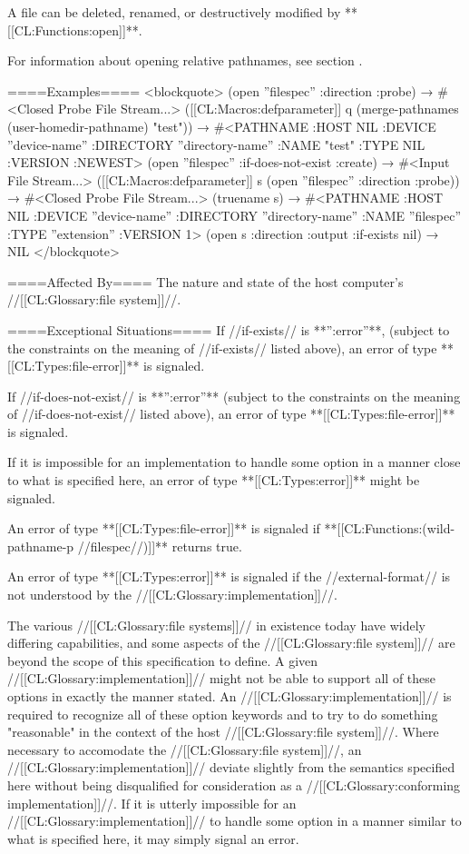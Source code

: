 A file can be deleted, renamed, or destructively modified by **[[CL:Functions:open]]**.

For information about opening relative pathnames, see section {\secref\MergingPathnames}.

====Examples====
<blockquote> (open ''filespec'' :direction :probe) → #<Closed Probe File Stream...> ([[CL:Macros:defparameter]] q (merge-pathnames (user-homedir-pathname) "test")) → #<PATHNAME :HOST NIL :DEVICE ''device-name'' :DIRECTORY ''directory-name'' :NAME "test" :TYPE NIL :VERSION :NEWEST> (open ''filespec'' :if-does-not-exist :create) → #<Input File Stream...> ([[CL:Macros:defparameter]] s (open ''filespec'' :direction :probe)) → #<Closed Probe File Stream...> (truename s) → #<PATHNAME :HOST NIL :DEVICE ''device-name'' :DIRECTORY ''directory-name'' :NAME ''filespec'' :TYPE ''extension'' :VERSION 1> (open s :direction :output :if-exists nil) → NIL </blockquote>

====Affected By====
The nature and state of the host computer's //[[CL:Glossary:file system]]//.

====Exceptional Situations====
If //if-exists// is **'':error''**, (subject to the constraints on the meaning of //if-exists// listed above), an error of type **[[CL:Types:file-error]]** is signaled.

If //if-does-not-exist// is **'':error''** (subject to the constraints on the meaning of //if-does-not-exist// listed above), an error of type **[[CL:Types:file-error]]** is signaled.

If it is impossible for an implementation to handle some option in a manner close to what is specified here, an error of type **[[CL:Types:error]]** might be signaled.

An error of type **[[CL:Types:file-error]]** is signaled if **[[CL:Functions:(wild-pathname-p //filespec//)]]** returns true.

An error of type **[[CL:Types:error]]** is signaled if the //external-format// is not understood by the //[[CL:Glossary:implementation]]//.

The various //[[CL:Glossary:file systems]]// in existence today have widely differing capabilities, and some aspects of the //[[CL:Glossary:file system]]// are beyond the scope of this specification to define. A given //[[CL:Glossary:implementation]]// might not be able to support all of these options in exactly the manner stated. An //[[CL:Glossary:implementation]]// is required to recognize all of these option keywords and to try to do something "reasonable" in the context of the host //[[CL:Glossary:file system]]//. Where necessary to accomodate the //[[CL:Glossary:file system]]//, an //[[CL:Glossary:implementation]]// deviate slightly from the semantics specified here without being disqualified for consideration as a //[[CL:Glossary:conforming implementation]]//. If it is utterly impossible for an //[[CL:Glossary:implementation]]// to handle some option in a manner similar to what is specified here, it may simply signal an error.

